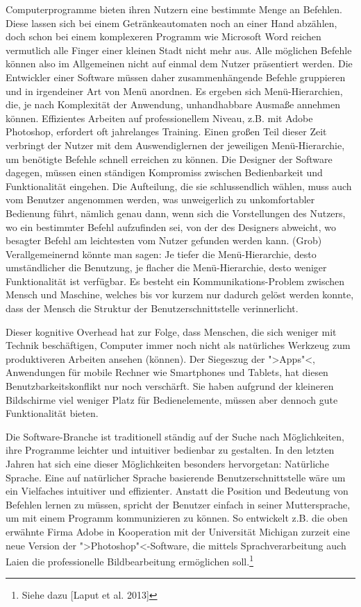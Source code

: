 \documentclass[12pt,a4paper]{article}
\theoremstyle{definition}
\begin{document}
		Computerprogramme bieten ihren Nutzern eine bestimmte Menge an Befehlen. Diese lassen sich bei einem Getränkeautomaten noch an einer Hand abzählen, doch schon bei einem komplexeren Programm wie Microsoft Word reichen vermutlich alle Finger einer kleinen Stadt nicht mehr aus. Alle möglichen Befehle können also im Allgemeinen nicht auf einmal dem Nutzer präsentiert werden. Die Entwickler einer Software müssen daher zusammenhängende Befehle gruppieren und in irgendeiner Art von Menü anordnen. Es ergeben sich Menü-Hierarchien, die, je nach Komplexität der Anwendung, unhandhabbare Ausmaße annehmen können. Effizientes Arbeiten auf professionellem Niveau, z.B. mit Adobe Photoshop, erfordert oft jahrelanges Training. Einen großen Teil dieser Zeit verbringt der Nutzer mit dem Auswendiglernen der jeweiligen Menü-Hierarchie, um benötigte Befehle schnell erreichen zu können. Die Designer der Software dagegen, müssen einen ständigen Kompromiss zwischen Bedienbarkeit und Funktionalität eingehen. Die Aufteilung, die sie schlussendlich wählen, muss auch vom Benutzer angenommen werden, was unweigerlich zu unkomfortabler Bedienung führt, nämlich genau dann, wenn sich die Vorstellungen des Nutzers, wo ein bestimmter Befehl aufzufinden sei, von der des Designers abweicht, wo besagter Befehl am leichtesten vom Nutzer gefunden werden kann. (Grob) Verallgemeinernd könnte man sagen: Je tiefer die Menü-Hierarchie, desto umständlicher die Benutzung, je flacher die Menü-Hierarchie, desto weniger Funktionalität ist verfügbar. Es besteht ein Kommunikations-Problem zwischen Mensch und Maschine, welches bis vor kurzem nur dadurch gelöst werden konnte, dass der Mensch die Struktur der Benutzerschnittstelle verinnerlicht.

		Dieser kognitive Overhead hat zur Folge, dass Menschen, die sich weniger mit Technik beschäftigen, Computer immer noch nicht als natürliches Werkzeug zum produktiveren Arbeiten ansehen (können). Der Siegeszug der ">Apps"<, Anwendungen für mobile Rechner wie Smartphones und Tablets, hat diesen Benutzbarkeitskonflikt nur noch verschärft. Sie haben aufgrund der kleineren Bildschirme viel weniger Platz für Bedienelemente, müssen aber dennoch gute Funktionalität bieten.

		Die Software-Branche ist traditionell ständig auf der Suche nach Möglichkeiten, ihre Programme leichter und intuitiver bedienbar zu gestalten. In den letzten Jahren hat sich eine dieser Möglichkeiten besonders hervorgetan: Natürliche Sprache. Eine auf natürlicher Sprache basierende Benutzerschnittstelle wäre um ein Vielfaches intuitiver und effizienter. Anstatt die Position und Bedeutung von Befehlen lernen zu müssen, spricht der Benutzer einfach in seiner Muttersprache, um mit einem Programm kommunizieren zu können. So entwickelt z.B. die oben erwähnte Firma Adobe in Kooperation mit der Universität Michigan zurzeit eine neue Version der ">Photoshop"<-Software, die mittels Sprachverarbeitung auch Laien die professionelle Bildbearbeitung ermöglichen soll.\footnote{Siehe dazu [Laput et al. 2013]}
\end{document}
